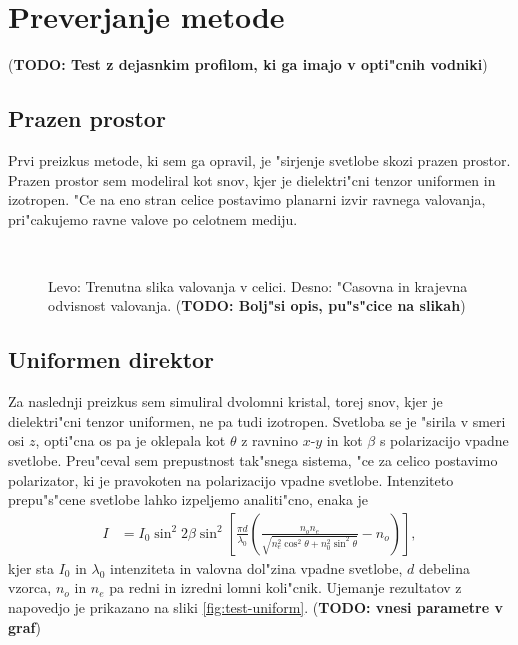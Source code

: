 \documentclass[a4paper,10pt]{article}
\newcommand{\todo}[1]{(\textbf{\textsc{TODO}: #1})}
\begin{document}
\section{Preverjanje metode}

\todo{Test z dejasnkim profilom, ki ga imajo v opti"cnih vodniki}

\subsection{Prazen prostor}

Prvi preizkus metode, ki sem ga opravil, je "sirjenje svetlobe skozi prazen prostor. 
Prazen prostor sem modeliral kot snov, kjer je dielektri"cni tenzor uniformen in izotropen. 
"Ce na eno stran celice postavimo planarni izvir ravnega valovanja, pri"cakujemo ravne valove po celotnem mediju. 

\begin{figure}[h]
 \centering
  \,
\caption{Levo: Trenutna slika valovanja v celici. Desno: "Casovna in krajevna odvisnost valovanja. \todo{Bolj"si opis, pu"s"cice na slikah}}
\label{fig:test-plane}
\end{figure}

\subsection{Uniformen direktor}

Za naslednji preizkus sem simuliral dvolomni kristal, torej snov, kjer je dielektri"cni tenzor uniformen, ne pa tudi izotropen. 
Svetloba se je "sirila v smeri osi $z$, opti"cna os pa je oklepala kot $\theta$ z ravnino $x$-$y$ in kot $\beta$ s polarizacijo vpadne svetlobe. 
Preu"ceval sem prepustnost tak"snega sistema, "ce za celico postavimo polarizator, ki je pravokoten na polarizacijo vpadne svetlobe. 
Intenziteto prepu"s"cene svetlobe lahko izpeljemo analiti"cno\cite{kleman}, enaka je
\begin{align}
 I &= I_0 \sin^2 2\beta \sin^2 \left[ \frac{\pi d}{\lambda_0} \left( \frac{n_o n_e}{\sqrt{n_e^2 \cos^2 \theta + n_0^2 \sin^2 \theta}} - n_o \right)\right],
\end{align}
kjer sta $I_0$ in $\lambda_0$ intenziteta in valovna dol"zina vpadne svetlobe, $d$ debelina vzorca, $n_o$ in $n_e$ pa redni in izredni lomni koli"cnik. 
Ujemanje rezultatov z napovedjo je prikazano na sliki \ref{fig:test-uniform}.
\todo{vnesi parametre v graf}
\end{document}
